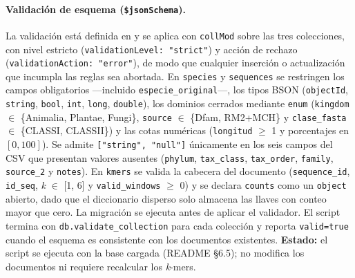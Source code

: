\documentclass[journal]{IEEEtran}
\begin{document}
\paragraph*{Validación de esquema (\texttt{\$jsonSchema}).}
La validación está definida en  y se aplica con
\texttt{collMod} sobre las tres colecciones, con nivel estricto
(\texttt{validationLevel: "strict"}) y acción de rechazo
(\texttt{validationAction: "error"}), de modo que cualquier inserción o actualización que
incumpla las reglas sea abortada. En \texttt{species} y \texttt{sequences} se restringen
los campos obligatorios ---incluido \texttt{especie\_original}---, los tipos BSON
(\texttt{objectId}, \texttt{string}, \texttt{bool}, \texttt{int}, \texttt{long},
\texttt{double}), los dominios cerrados mediante \texttt{enum} (\texttt{kingdom}
$\in$ \{Animalia, Plantae, Fungi\}, \texttt{source} $\in$ \{Dfam, RM2+MCH\} y
\texttt{clase\_fasta} $\in$ \{CLASSI, CLASSII\}) y las cotas numéricas (\texttt{longitud}
$\geq$ 1 y porcentajes en $[0, 100]$). Se admite \texttt{["string", "null"]} únicamente
en los seis campos del CSV que presentan valores ausentes (\texttt{phylum},
\texttt{tax\_class}, \texttt{tax\_order}, \texttt{family}, \texttt{source\_2} y \texttt{notes}). En
\texttt{kmers} se valida la cabecera del documento (\texttt{sequence\_id}, \texttt{id\_seq},
\textit{k} $\in$ [1, 6] y \texttt{valid\_windows} $\geq$ 0) y se declara \texttt{counts} como
un \texttt{object} abierto, dado que el diccionario disperso solo almacena las llaves con
conteo mayor que cero. La migración  se
ejecuta antes de aplicar el validador. El script termina con
\texttt{db.validate\_collection} para cada colección y reporta \texttt{valid=true} cuando
el esquema es consistente con los documentos existentes. \textbf{Estado:} el script se
ejecuta con la base cargada (README \S6.5); no modifica los documentos ni requiere
recalcular los \textit{k}-mers.
\end{document}
